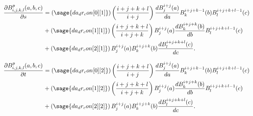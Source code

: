 \documentclass{article}
\begin{document}
\begin{align*}
\frac{\partial B^p_{i,j,k,l}(a,b,c)}{\partial s}
& = \left(\sage{da_dr_con[0][1]}\right)\left(\frac{i+j+k+l}{i+j}\right) \frac{d B^{i+j}_j(a)}{da} B^{i+j+k-1}_k(b) B^{i+j+k+l-1}_l(c) \\
& + \left(\sage{da_dr_con[1][1]}\right)\left(\frac{i+j+k+l}{i+j+k}\right) B^{i+j}_j(a) \frac{d B^{i+j+k}_k(b)}{db} B^{i+j+k+l-1}_l(c) \\
& + \left(\sage{da_dr_con[2][1]}\right) B^{i+j}_j(a) B^{i+j+k}_k(b) \frac{d B^{i+j+k+l}_l(c)}{dc}.
\end{align*}

\begin{align*}
\frac{\partial B^p_{i,j,k,l}(a,b,c)}{\partial t}
& = \left(\sage{da_dr_con[0][2]}\right)\left(\frac{i+j+k+l}{i+j}\right) \frac{d B^{i+j}_j(a)}{da} B^{i+j+k-1}_k(b) B^{i+j+k+l-1}_l(c) \\
& + \left(\sage{da_dr_con[1][2]}\right)\left(\frac{i+j+k+l}{i+j+k}\right) B^{i+j}_j(a) \frac{d B^{i+j+k}_k(b)}{db} B^{i+j+k+l-1}_l(c) \\
& + \left(\sage{da_dr_con[2][2]}\right) B^{i+j}_j(a) B^{i+j+k}_k(b) \frac{d B^{i+j+k+l}_l(c)}{dc}.
\end{align*}
\end{document}
